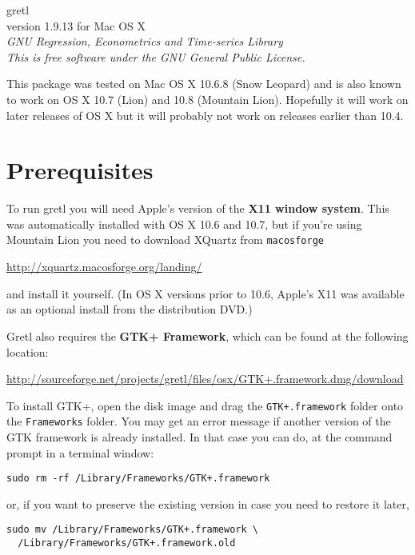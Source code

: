 \documentclass[11pt]{article}
\begin{document}
\begin{center}
{\color{gold} \titlefont gretl} \\[1ex]
version 1.9.13 for Mac OS X \\[2ex]

\textit{GNU Regression, Econometrics and Time-series Library\\
  This is free software under the GNU General Public License.}

\end{center}

This package was tested on Mac OS X 10.6.8 (Snow Leopard) and
is also known to work on OS X 10.7 (Lion) and 10.8 (Mountain Lion).
Hopefully it will work on later releases of OS X but it will probably
not work on releases earlier than 10.4.

\section{Prerequisites}
\label{sec:os}

To run \textsf{gretl} you will need Apple's version of the \textbf{X11
  window system}. This was automatically installed with OS X 10.6 and
10.7, but if you're using Mountain Lion you need to download XQuartz
from \texttt{macosforge}

\url{http://xquartz.macosforge.org/landing/}

and install it yourself. (In OS X versions prior to 10.6, Apple's X11 was 
available as an optional install from the distribution DVD.)

\textsf{Gretl} also requires the \textbf{GTK+ Framework}, which can be
found at the following location:

\url{http://sourceforge.net/projects/gretl/files/osx/GTK+.framework.dmg/download}

To install GTK+, open the disk image and drag the
\texttt{GTK+.framework} folder onto the \texttt{Frameworks}
folder. You may get an error message if another version of the GTK
framework is already installed. In that case you can do, at the
command prompt in a terminal window:

\verb|sudo rm -rf /Library/Frameworks/GTK+.framework|

or, if you want to preserve the existing version in case you need to
restore it later,
\begin{verbatim}
sudo mv /Library/Frameworks/GTK+.framework \
  /Library/Frameworks/GTK+.framework.old
\end{verbatim}
\end{document}
